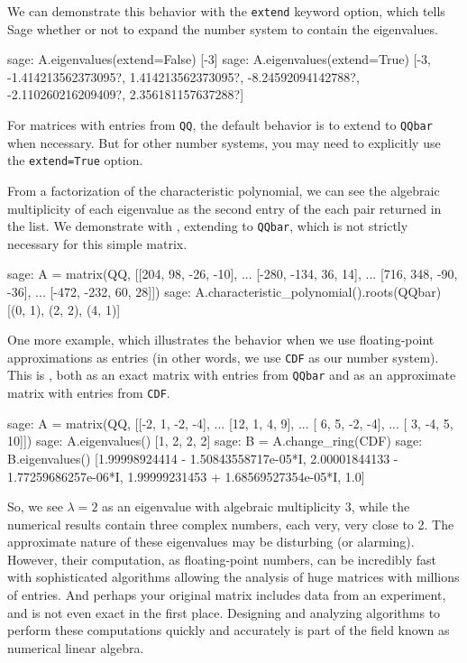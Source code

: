 %
We can demonstrate this behavior with the \verb!extend! keyword option, which tells Sage whether or not to expand the number system to contain the eigenvalues.
%
\begin{sageexample}
sage: A.eigenvalues(extend=False)
[-3]
sage: A.eigenvalues(extend=True)
[-3, -1.414213562373095?, 1.414213562373095?,
 -8.24592094142788?, -2.110260216209409?, 2.356181157637288?]
\end{sageexample}
%
For matrices with entries from \verb!QQ!, the default behavior is to extend to \verb!QQbar! when necessary.  But for other number systems, you may need to explicitly use the \verb!extend=True! option.\par
%
From a factorization of the characteristic polynomial, we can see the algebraic multiplicity of each eigenvalue as the second entry of the each pair returned in the list.  We demonstrate with , extending to \verb!QQbar!, which is not strictly necessary for this simple matrix.
%
\begin{sageexample}
sage: A = matrix(QQ, [[204, 98, -26, -10],
...                   [-280, -134, 36, 14],
...                   [716, 348, -90, -36],
...                   [-472, -232, 60, 28]])
sage: A.characteristic_polynomial().roots(QQbar)
[(0, 1), (2, 2), (4, 1)]
\end{sageexample}
%
One more example, which illustrates the behavior when we use floating-point approximations as entries (in other words, we use \verb!CDF! as our number system).  This is , both as an exact matrix with entries from \verb!QQbar! and as an approximate matrix with entries from \verb!CDF!.
%
\begin{sageexample}
sage: A = matrix(QQ, [[-2,  1, -2, -4],
...                   [12,  1,  4,  9],
...                   [ 6,  5, -2, -4],
...                   [ 3, -4,  5, 10]])
sage: A.eigenvalues()
[1, 2, 2, 2]
sage: B = A.change_ring(CDF)
sage: B.eigenvalues()
[1.99998924414 - 1.50843558717e-05*I,
 2.00001844133 - 1.77259686257e-06*I,
 1.99999231453 + 1.68569527354e-05*I,
 1.0]
\end{sageexample}
%
So, we see $\lambda=2$ as an eigenvalue with algebraic multiplicity 3, while the numerical results contain three complex numbers, each very, very close to 2.  The approximate nature of these eigenvalues may be disturbing (or alarming).  However, their computation, as floating-point numbers, can be incredibly fast with sophisticated algorithms allowing the analysis of huge matrices with millions of entries.  And perhaps your original matrix includes data from an experiment, and is not even exact in the first place.  Designing and analyzing algorithms to perform these computations quickly and accurately is part of the field known as numerical linear algebra.\par

